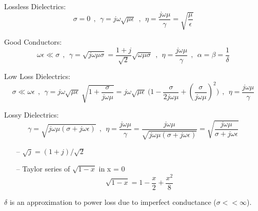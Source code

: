 Lossless Dielectrics:
$$ \sigma = 0 ~~ , ~~ \gamma = j \omega \sqrt{\mu \epsilon} ~~ , ~~ \eta = \frac{j \omega \mu}{\gamma} = \sqrt{\frac{\mu}{\epsilon}} $$
\par
Good Conductors:
$$ \omega \epsilon \ll \sigma ~~ , ~~ \gamma = \sqrt{j \omega \mu \sigma } =\frac{1+j}{\sqrt{2}} \sqrt{\omega \mu \sigma}~~ , ~~ \eta = \frac{j \omega \mu}{\gamma} ~~ , ~~ \alpha = \beta = \frac{1}{\delta}$$
\par
Low Loss Dielectrics: 
$$ \sigma \ll \omega \epsilon ~~ , ~~ \gamma = j \omega \sqrt{\mu \epsilon}~\sqrt{1+\frac{\sigma}{j \omega \mu}} = j \omega \sqrt{\mu \epsilon}~\Big(1 - \frac{\sigma}{2 j \omega \mu} + (\frac{\sigma}{j \omega \mu})^2\Big)~~ , ~~ \eta = \frac{j \omega \mu}{\gamma} $$
\par
Lossy Dielectrics: 
$$  \gamma = \sqrt{j \omega \mu (\sigma + j \omega \epsilon)}~~ , ~~ \eta = \frac{j \omega \mu}{\gamma} = \frac{j \omega \mu}{\sqrt{j \omega \mu (\sigma + j \omega \epsilon)}} = \sqrt{\frac{j \omega \mu}{\sigma + j \omega \epsilon}} $$
\setlength{\parindent}{0.0cm} %
\par
\begin{itemize}
\item[--] $\sqrt{j} = (1+j)/\sqrt{2}$
\item[--] Taylor series of $\sqrt{1-x}$ in x = 0
$$ \sqrt{1-x} = 1 - \frac{x}{2} + \frac{x^2}{8} $$
\end{itemize}
\par
$\delta$ is an approximation to power loss due to imperfect conductance ($\sigma<<\infty$).
\par
\begin{minipage}[b]{.49\textwidth}
\lipsum[1-2]
\end{minipage}%
\hspace{.02\textwidth}
\begin{minipage}[b]{.49\textwidth}
\lipsum[1-2]
\end{minipage}%

